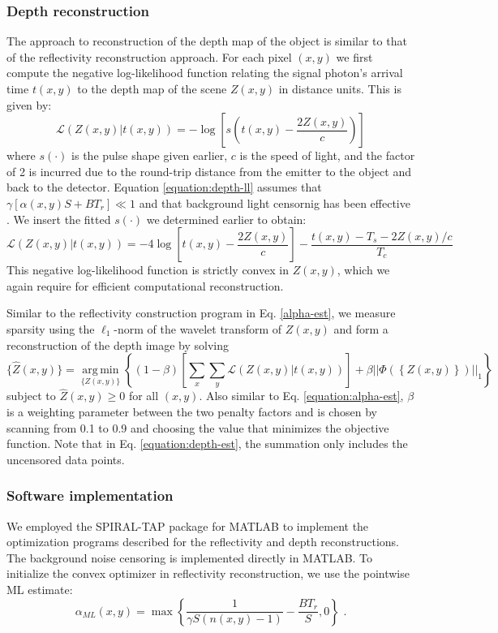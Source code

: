 \subsubsection{Depth reconstruction}
The approach to reconstruction of the depth map of the object is similar to that of the reflectivity reconstruction approach. For each pixel $(x,y)$ we first compute the negative log-likelihood function relating the signal photon's arrival time $t(x,y)$ to the depth map of the scene $Z(x,y)$ in distance units. This is given by:
\begin{equation}
\mathcal{L}(Z(x,y) | t(x,y)) = -\log\left[ s(t(x,y) - \frac{2Z(x,y)}{c}) \right]
\label{equation:depth-ll}
\end{equation}
where $s(\cdot)$ is the pulse shape given earlier, $c$ is the speed of light, and the factor of 2 is incurred due to the round-trip distance from the emitter to the object and back to the detector. Equation \ref{equation:depth-ll} assumes that $\gamma[\alpha(x,y)S + BT_r] \ll 1$ and that background light censornig has been effective \cite{kirmani-first}. We insert the fitted $s(\cdot)$ we determined earlier to obtain:
\begin{equation}
\mathcal{L}(Z(x,y) | t(x,y)) = -4\log\left[ t(x,y) - \frac{2Z(x,y)}{c} \right] - \frac{t(x,y) - T_s - 2Z(x,y)/c}{T_c}
\end{equation}
This negative log-likelihood function is strictly convex in $Z(x,y)$, which we again require for efficient computational reconstruction.

Similar to the reflectivity construction program in Eq. \ref{alpha-est}, we measure sparsity using the $\ell_1$-norm of the wavelet transform of $Z(x,y)$ and form a reconstruction of the depth image by solving
\begin{equation}
\{ \hat{Z}(x,y) \} = \underset{\{Z(x,y)\}}{\operatorname{arg\,min}} \left\{ (1 - \beta) \left[ \sum_x \sum_y \mathcal{L}( Z(x,y) | t(x,y) ) \right] + \beta || \Phi\left(\left\{ Z(x,y) \right\}\right) ||_1 \right\}
\label{equation:depth-est}
\end{equation}
subject to $\hat{Z}(x,y) \geq 0$ for all $(x,y)$. Also similar to Eq. \ref{equation:alpha-est}, $\beta$ is a weighting parameter between the two penalty factors and is chosen by scanning from 0.1 to 0.9 and choosing the value that minimizes the objective function. Note that in Eq. \ref{equation:depth-est}, the summation only includes the uncensored data points.

\subsubsection{Software implementation}
We employed the SPIRAL-TAP package for MATLAB \cite{harmany-spiral} to implement the optimization programs described for the reflectivity and depth reconstructions. The background noise censoring is implemented directly in MATLAB. To initialize the convex optimizer in reflectivity reconstruction, we use the pointwise ML estimate:
\begin{equation}
\alpha_{ML}(x,y) = \operatorname{max}\left\{ \frac{1}{\gamma S (n(x,y) - 1)} - \frac{BT_r}{S}, 0 \right\}\,\,.
\end{equation}

